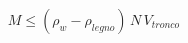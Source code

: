 \documentclass[preview]{standalone}
\begin{document}
\begin{align*}
M \le (\rho_w-\rho_{legno})\, N\, V_{tronco}
\end{align*}
\end{document}
